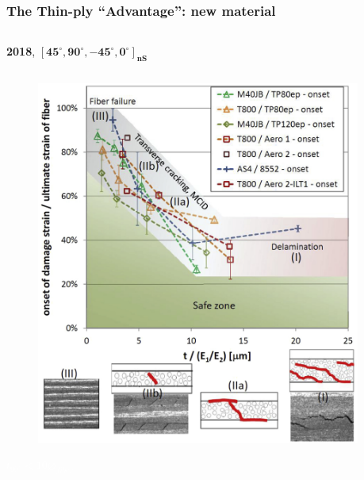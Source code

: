\documentclass[first,firstsupp,lastsupp,last,hyperref,table]{ETHclass}
\begin{document}
\begin{frame}
\frametitle{\vspace{0.3cm}\small The Thin-ply ``Advantage'': new material}
\vspace{-0.8cm}
\centering
\begin{columns}[t]
\begin{column}{0.5\textwidth}
\centering
\tiny
\textbf{2018}, $\mathbf{\left[45^{\circ}, 90^{\circ},-45^{\circ},0^{\circ}\right]_{nS}}$
\end{column}
\begin{column}{0.5\textwidth}
\centering

\end{column}
\end{columns}
\vspace{-0.4cm}
\begin{columns}[c]
\begin{column}{0.5\textwidth}
\begin{figure}
\centering
\includegraphics[width=0.9\columnwidth]{thinply-plythicknesseffect.jpg}
\end{figure}
\vspace{-0.6cm}
\centering
\textcolor{white}{\tiny$t_{90^{\circ}}<10\diameter_{fiber}$}
\end{column}
\begin{column}{0.5\textwidth}

\end{column}
\end{columns}
\end{frame}
\end{document}
